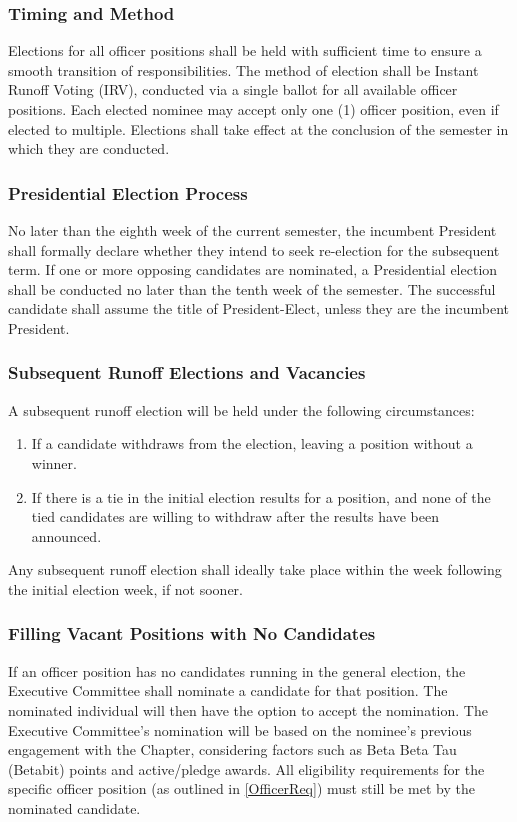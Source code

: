 \documentclass[10pt, oneside]{article}
\begin{document}
\subsubsection{Timing and Method}
Elections for all officer positions shall be held with sufficient time to ensure a smooth transition of responsibilities. The method of election shall be Instant Runoff Voting (IRV), conducted via a single ballot for all available officer positions. Each elected nominee may accept only one (1) officer position, even if elected to multiple. Elections shall take effect at the conclusion of the semester in which they are conducted.

\subsubsection{Presidential Election Process}
No later than the eighth week of the current semester, the incumbent President shall formally declare whether they intend to seek re-election for the subsequent term. If one or more opposing candidates are nominated, a Presidential election shall be conducted no later than the tenth week of the semester. The successful candidate shall assume the title of President-Elect, unless they are the incumbent President.

\subsubsection{Subsequent Runoff Elections and Vacancies}
A subsequent runoff election will be held under the following circumstances:
\begin{enumerate}[label=\alph*.]
    \item If a candidate withdraws from the election, leaving a position without a winner.
    \item If there is a tie in the initial election results for a position, and none of the tied candidates are willing to withdraw after the results have been announced.
\end{enumerate}
Any subsequent runoff election shall ideally take place within the week following the initial election week, if not sooner.

\subsubsection{Filling Vacant Positions with No Candidates}
If an officer position has no candidates running in the general election, the Executive Committee shall nominate a candidate for that position. The nominated individual will then have the option to accept the nomination. The Executive Committee's nomination will be based on the nominee's previous engagement with the Chapter, considering factors such as Beta Beta Tau (Betabit) points and active/pledge awards. All eligibility requirements for the specific officer position (as outlined in \ref{OfficerReq}) must still be met by the nominated candidate.
\end{document}
